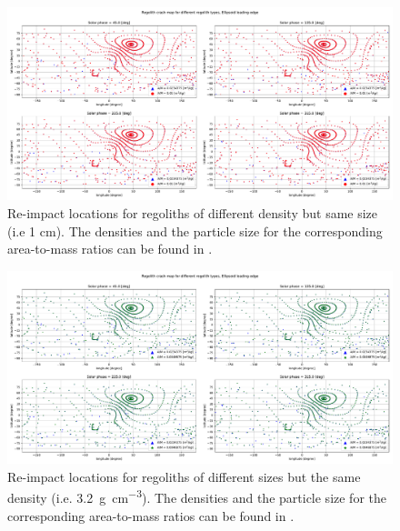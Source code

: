 \begin{figure}[htb]
\centering
\captionsetup{justification=centering}
\includegraphics[angle=90, width=\textwidth, height=\textheight, keepaspectratio=true]{leading_edge_perturbations/crashMap_3P2_7P5_density_1cm_radius.pdf}
\caption{Re-impact locations for regoliths of different density but same size (i.e 1 cm). The densities and the particle size for the corresponding area-to-mass ratios can be found in .}
\label{fig:crashmap_3.2_7.5_density_1cmRadius_leadingEdge}
\end{figure}
\FloatBarrier
\begin{figure}[htb]
\centering
\captionsetup{justification=centering}
\includegraphics[angle=90, width=\textwidth, height=\textheight, keepaspectratio=true]{leading_edge_perturbations/crashMap_3P2_density_1cm_5cm_radius.pdf}
\caption{Re-impact locations for regoliths of different sizes but the same density (i.e. \SI{3.2}{\gram\per\centi\metre\cubed}). The densities and the particle size for the corresponding area-to-mass ratios can be found in .}
\label{fig:crashmap_3.2_density_1cm_5cm_Radius_leadingEdge}
\end{figure}
\FloatBarrier
